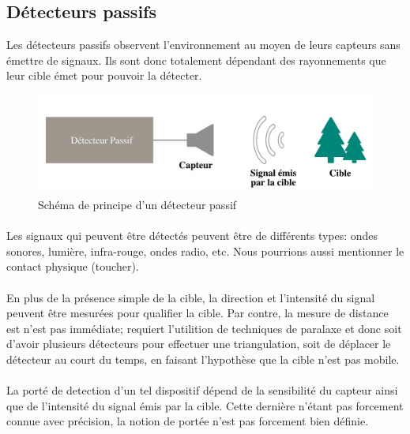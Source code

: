 \documentclass[12pt,a4paper]{report}
\begin{document}
\subsection{Détecteurs passifs}

Les détecteurs passifs observent l'environnement au moyen de leurs capteurs sans émettre de signaux. Ils sont donc totalement dépendant des rayonnements que leur cible émet pour pouvoir la détecter.

\begin{figure}[H]
	\centering
	\includegraphics[width=0.8\linewidth]{img/detecteurpassif}
	\caption{Schéma de principe d'un détecteur passif}
	\label{fig:detecteurpassif}
\end{figure}

\paragraph{} Les signaux qui peuvent être détectés peuvent être de différents types: ondes sonores, lumière, infra-rouge, ondes radio, etc. Nous pourrions aussi mentionner le contact physique (toucher).

\paragraph{} En plus de la présence simple de la cible, la direction et l'intensité du signal peuvent être mesurées pour qualifier la cible. Par contre, la mesure de distance est n'est pas immédiate; requiert l'utilition de techniques de paralaxe et donc soit d'avoir plusieurs détecteurs pour effectuer une triangulation, soit de déplacer le détecteur au court du temps, en faisant l'hypothèse que la cible n'est pas mobile.

\paragraph{} La porté de detection d'un tel dispositif dépend de la sensibilité du capteur ainsi que de l'intensité du signal émis par la cible. Cette dernière n'étant pas forcement connue avec précision, la notion de portée n'est pas forcement bien définie.
\end{document}
